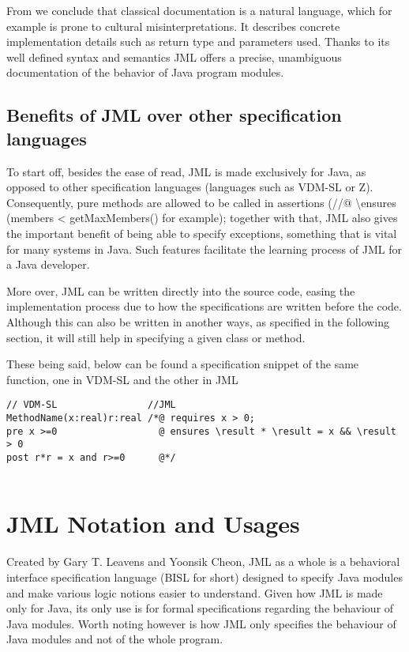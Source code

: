 \documentclass{article}
\begin{document}
From \cite{meyer1987eiffel} we conclude that classical documentation is a natural language, which for example is prone to cultural misinterpretations. It describes concrete implementation details such as return type and parameters used. Thanks to its well defined syntax and semantics JML offers a precise, unambiguous documentation of the behavior of Java program modules.


\subsection{Benefits of JML over other specification languages}
To start off, besides the ease of read, JML is made exclusively for Java, as opposed to other specification languages (languages such as VDM-SL or Z). Consequently, pure methods are allowed to be called in assertions (//@ \textbackslash ensures (members < getMaxMembers() for example); together with that, JML also gives the important benefit of being able to specify exceptions, something that is vital for many systems in Java. Such features facilitate the learning process of JML for a Java developer.

More over, JML can be written directly into the source code, easing the implementation process due to how the specifications are written before the code. Although this can also be written in another ways, as specified in the following section, it will still help in specifying a given class or method.

These being said, below can be found a specification snippet of the same function, one in VDM-SL and the other in JML

\begin{lstlisting}[columns=fixed, basewidth=0.5em, basicstyle={\ttfamily}]
// VDM-SL                //JML
MethodName(x:real)r:real /*@ requires x > 0;
pre x >=0                  @ ensures \result * \result = x && \result > 0
post r*r = x and r>=0      @*/


\end{lstlisting}


\section{JML Notation and Usages}
Created by Gary T. Leavens and Yoonsik Cheon, \cite{leavens1999jml} JML as a whole is a behavioral interface specification language (BISL for short) designed to specify Java modules and make various logic notions easier to understand. Given how JML is made only for Java, its only use is for formal specifications regarding the behaviour of Java modules. Worth noting however is how JML only specifies the behaviour of Java modules and not of the whole program.
\end{document}
